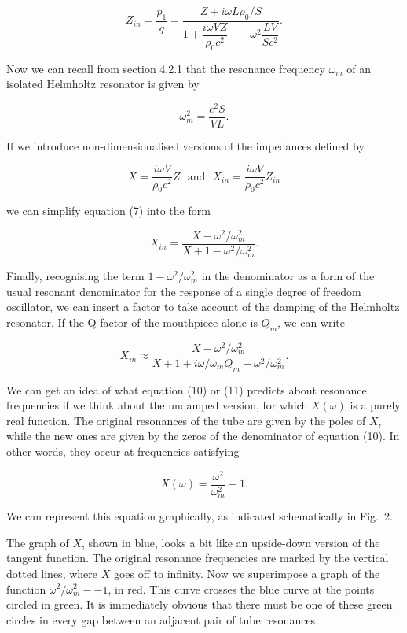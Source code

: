   $$Z_{in} =\dfrac{p_1}{q}=\dfrac{Z+i \omega L \rho_0/S}{1+ \dfrac{i \omega V 
  Z}{\rho_0 c^2} -- \omega^2 \dfrac{LV}{Sc^2}} . \tag{7}$$ 

  Now we can recall from section 4.2.1 that the resonance frequency $\omega_m$ 
  of an isolated Helmholtz resonator is given by 

  $$\omega_m^2 =\dfrac{c^2S}{VL} . \tag{8}$$ 

  If we introduce non-dimensionalised versions of the impedances defined by 

  $$X=\dfrac{i \omega V}{\rho_0 c^2}Z \mathrm{~~~and~~~} X_{in}=\dfrac{i \omega 
  V}{\rho_0 c^2}Z_{in} \tag{9}$$ 

  we can simplify equation (7) into the form 

  $$X_{in}=\dfrac{X-\omega^2/\omega_m^2}{X+1-\omega^2/\omega_m^2}. \tag{10}$$ 

  Finally, recognising the term $1-\omega^2/\omega_m^2$ in the denominator as a 
  form of the usual resonant denominator for the response of a single degree of 
  freedom oscillator, we can insert a factor to take account of the damping of 
  the Helmholtz resonator. If the Q-factor of the mouthpiece alone is $Q_m$, we 
  can write 

  $$X_{in} \approx \dfrac{X-\omega^2/\omega_m^2}{X+1+i \omega/\omega_m 
  Q_m-\omega^2/\omega_m^2}. \tag{11}$$ 

  We can get an idea of what equation (10) or (11) predicts about resonance 
  frequencies if we think about the undamped version, for which $X(\omega)$ is 
  a purely real function. The original resonances of the tube are given by the 
  poles of $X$, while the new ones are given by the zeros of the denominator of 
  equation (10). In other words, they occur at frequencies satisfying 

  $$X(\omega)=\dfrac{\omega^2}{\omega_m^2}-1. \tag{12}$$ 

  We can represent this equation graphically, as indicated schematically in 
  Fig.\ 2. 


  The graph of $X$, shown in blue, looks a bit like an upside-down version of 
  the tangent function. The original resonance frequencies are marked by the 
  vertical dotted lines, where $X$ goes off to infinity. Now we superimpose a 
  graph of the function $\omega^2/\omega_m^2 -- 1$, in red. This curve crosses 
  the blue curve at the points circled in green. It is immediately obvious that 
  there must be one of these green circles in every gap between an adjacent 
  pair of tube resonances. 

